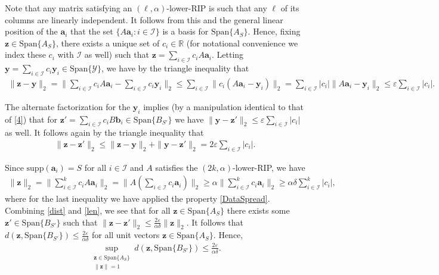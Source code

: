 \documentclass[journal,onecolumn]{IEEEtran}
\begin{document}
Note that any matrix satisfying an $(\ell,\alpha)$-lower-RIP is such that any $\ell$ of its columns are linearly independent. It follows from this and the general linear position of the $\mathbf{a}_i$ that the set $\{A\mathbf{a}_i: i \in \mathcal{I}\}$ is a basis for $\text{Span}\{A_S\}$. Hence, fixing $\mathbf{z} \in \text{Span}\{A_S\}$, there exists a unique set of $c_i \in \mathbb{R}$ (for notational convenience we index these $c_i$ with $\mathcal{I}$ as well) such that $\mathbf{z} = \sum_{i \in \mathcal{I}} c_iA\mathbf{a}_i$. Letting $\mathbf{y} = \sum_{i \in \mathcal{I}} c_i\mathbf{y}_i  \in \text{Span}\{\mathcal{Y}\}$, we have by the triangle inequality that
\begin{align}\label{4}
\|\mathbf{z} - \mathbf{y}\|_2 = \| \sum_{i \in \mathcal{I}} c_i A \mathbf{a}_i -  \sum_{i \in \mathcal{I}} c_i \mathbf{y}_i \|_2 \leq \sum_{i \in \mathcal{I}} \| c_i (A\mathbf{a}_i - \mathbf{y}_i) \|_2 = \sum_{i \in \mathcal{I}} |c_i| \| A\mathbf{a}_i - \mathbf{y}_i \|_2 \leq \varepsilon \sum_{i \in \mathcal{I}} |c_i|.
\end{align}

The alternate factorization for the $\mathbf{y}_i$ implies (by a manipulation identical to that of \eqref{4}) that for $\mathbf{z}' = \sum_{i \in \mathcal{I}} c_i B\mathbf{b}_i \in \text{Span}\{B_{S'}\}$ we have $\|\mathbf{y} - \mathbf{z}'\|_2 \leq \varepsilon \sum_{i \in \mathcal{I}} |c_i|$ as well. It follows again by the triangle inequality that
\begin{align}\label{dist}
\|\mathbf{z} - \mathbf{z}'\|_2 \leq \|\mathbf{z} - \mathbf{y}\|_2 + \|\mathbf{y} - \mathbf{z}'\|_2 = 2 \varepsilon \sum_{i \in \mathcal{I}} |c_i|.
\end{align}

Since $\text{supp}(\mathbf{a}_i) = S$ for all $i \in \mathcal{I}$ and $A$ satisfies the $(2k,\alpha)$-lower-RIP, we have 
\begin{align}\label{len}
\|\mathbf{z}\|_2 = \|\sum_{i \in \mathcal{I}}^k c_i A \mathbf{a}_i\|_2 
= \|A (\sum_{i \in \mathcal{I}} c_i \mathbf{a}_i) \|_2 
\geq \alpha \|\sum_{i \in \mathcal{I}}^k c_i \mathbf{a}_i\|_2 
\geq \alpha\delta \sum_{i \in \mathcal{I}}^k |c_i|,
\end{align}
%
where for the last inequality we have applied the property \eqref{DataSpread}. Combining \eqref{dist} and \eqref{len}, we see that for all $\mathbf{z} \in \text{Span}\{A_S\}$ there exists some $\mathbf{z}' \in \text{Span}\{B_{S'}\}$ such that $\|\mathbf{z} - \mathbf{z}'\|_2 \leq \frac{ 2 \varepsilon }{ \alpha \delta } \|\mathbf{z}\|_2$. It follows that $d(\mathbf{z}, \text{Span}\{B_{S'}\}) \leq \frac{ 2 \varepsilon }{ \alpha \delta }$ for all unit vectors $\mathbf{z} \in \text{Span}\{A_S\}$. Hence,
\begin{align}\label{ABSubspaceDistance}
\sup_{ \substack{ \mathbf{z} \in \text{Span}\{A_{S}\} \\ \|\mathbf{z}\| = 1} } d(\mathbf{z}, \text{Span}\{B_{S'}\}) \leq \frac{ 2 \varepsilon }{ \alpha \delta }.
\end{align}
\end{document}
